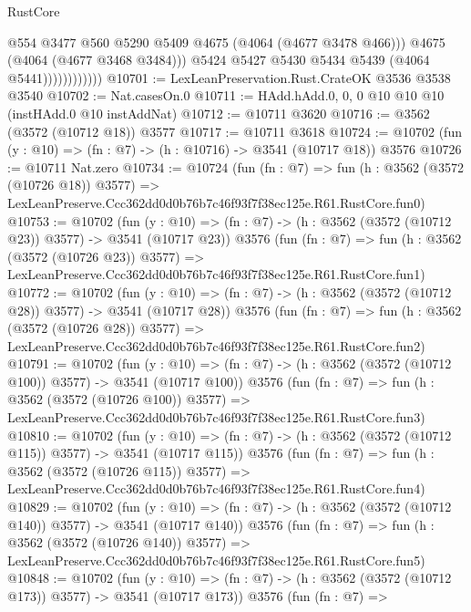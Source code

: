 \begin{lexlean}{RustCore}
\begin{coremodule}
                              @554
                              @3477
                              @560
                              @5290
                              @5409
                              @4675
                              (@4064 (@4677 @3478 @466)))
                            @4675
                            (@4064 (@4677 @3468 @3484)))
                          @5424
                          @5427
                          @5430
                          @5434
                          @5439
                          (@4064 @5441))))))))))))
@10701 := LexLeanPreservation.Rust.CrateOK @3536 @3538 @3540
@10702 := Nat.casesOn.{0}
@10711 := HAdd.hAdd.{0, 0, 0} @10 @10 @10 (instHAdd.{0} @10 instAddNat)
@10712 := @10711 @3620
@10716 := @3562 (@3572 (@10712 @18)) @3577
@10717 := @10711 @3618
@10724 := @10702 (fun (y : @10) => (fn : @7) -> (h : @10716) -> @3541 (@10717 @18)) @3576
@10726 := @10711 Nat.zero
@10734 := @10724
    (fun (fn : @7) =>
    fun (h : @3562 (@3572 (@10726 @18)) @3577) =>
    LexLeanPreserve.Ccc362dd0d0b76b7c46f93f7f38ec125e.R61.RustCore.fun0)
@10753 := @10702
    (fun (y : @10) => (fn : @7) -> (h : @3562 (@3572 (@10712 @23)) @3577) -> @3541 (@10717 @23))
    @3576
    (fun (fn : @7) =>
    fun (h : @3562 (@3572 (@10726 @23)) @3577) =>
    LexLeanPreserve.Ccc362dd0d0b76b7c46f93f7f38ec125e.R61.RustCore.fun1)
@10772 := @10702
    (fun (y : @10) => (fn : @7) -> (h : @3562 (@3572 (@10712 @28)) @3577) -> @3541 (@10717 @28))
    @3576
    (fun (fn : @7) =>
    fun (h : @3562 (@3572 (@10726 @28)) @3577) =>
    LexLeanPreserve.Ccc362dd0d0b76b7c46f93f7f38ec125e.R61.RustCore.fun2)
@10791 := @10702
    (fun (y : @10) => (fn : @7) -> (h : @3562 (@3572 (@10712 @100)) @3577) -> @3541 (@10717 @100))
    @3576
    (fun (fn : @7) =>
    fun (h : @3562 (@3572 (@10726 @100)) @3577) =>
    LexLeanPreserve.Ccc362dd0d0b76b7c46f93f7f38ec125e.R61.RustCore.fun3)
@10810 := @10702
    (fun (y : @10) => (fn : @7) -> (h : @3562 (@3572 (@10712 @115)) @3577) -> @3541 (@10717 @115))
    @3576
    (fun (fn : @7) =>
    fun (h : @3562 (@3572 (@10726 @115)) @3577) =>
    LexLeanPreserve.Ccc362dd0d0b76b7c46f93f7f38ec125e.R61.RustCore.fun4)
@10829 := @10702
    (fun (y : @10) => (fn : @7) -> (h : @3562 (@3572 (@10712 @140)) @3577) -> @3541 (@10717 @140))
    @3576
    (fun (fn : @7) =>
    fun (h : @3562 (@3572 (@10726 @140)) @3577) =>
    LexLeanPreserve.Ccc362dd0d0b76b7c46f93f7f38ec125e.R61.RustCore.fun5)
@10848 := @10702
    (fun (y : @10) => (fn : @7) -> (h : @3562 (@3572 (@10712 @173)) @3577) -> @3541 (@10717 @173))
    @3576
    (fun (fn : @7) =>

\end{coremodule}
\end{lexlean}

